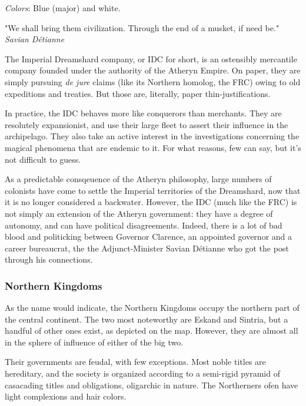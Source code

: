 \textit{Colors}: Blue (major) and white.


\begin{rpg-quotebox}
    "We shall bring them civilization. Through the end of a musket, if need be." \\ \textendash \textit{Savian Détianne}
\end{rpg-quotebox}
    

The Imperial Dreamshard company, or IDC for short, is an ostensibly mercantile company founded under the authority of the Atheryn Empire. On paper, they are simply pursuing \textit{de jure} claims (like its Northern homolog, the FRC) owing to old expeditions and treaties. But those are, literally, paper thin-justifications. 

In practice, the IDC behaves more like conquerors than merchants. They are resolutely expansionist, and use their large fleet to assert their influence in the archipelago. They also take an active interest in the investigations concerning the magical phenomena that are endemic to it. For what reasons, few can say, but it's not difficult to guess.


As a predictable consqeuence of the Atheryn philosophy, large numbers of colonists have come to settle the Imperial territories of the Dreamshard, now that it is no longer considered a backwater. However, the IDC (much like the FRC) is not simply an extension of the Atheryn government: they have a degree of autonomy, and can have political disagreements. Indeed, there is a lot of bad blood and politicking between Governor Clarence, an appointed governor and a career bureaucrat, the the Adjunct-Minister Savian Détianne who got the post through his connections.


\subsubsection{Northern Kingdoms}


As the name would indicate, the Northern Kingdoms occupy the northern part of the central continent. The two most noteworthy are Eskand and Sintria, but a handful of other ones exist, as depicted on the map. However, they are almost all in the sphere of influence of either of the big two.

Their governments are feudal, with few exceptions. Most noble titles are hereditary, and the society is organized according to a semi-rigid pyramid of casacading titles and obligations, oligarchic in nature. The Northerners ofen have light complexions and hair colors.





